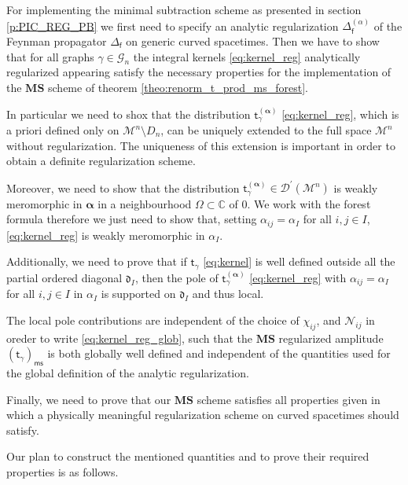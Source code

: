 \documentclass[11pt]{book}
\newcommand{\ms}{\mathsf{ms}}
\newcommand{\MS}{\textbf{MS}}
\newcommand{\alphabd}{\boldsymbol{\alpha}}
\newcommand{\Dcal}{\mathcal{D}}
\newcommand{\Gcal}{\mathcal{G}}
\newcommand{\Mcal}{\mathcal{M}}
\newcommand{\Ncal}{\mathcal{N}}
\newcommand{\Cbb}{\mathbb{C}}
\newcommand{\drak}{\mathfrak{d}}
\newcommand{\fsf}{\mathsf{f}}
\newcommand{\tsf}{\mathsf{t}}
\theoremstyle{break}
\begin{document}
For implementing the minimal subtraction scheme as presented in section \ref{p:PIC_REG_PB} we first need to specify an analytic regularization $\Delta^{(\alpha)}_\fsf$ of the Feynman propagator $\Delta_\fsf$ on generic curved spacetimes. Then we have to show that for all graphs $\gamma \in \Gcal_n$ the integral kernels \eqref{eq:kernel_reg} analytically regularized appearing satisfy the necessary properties for the implementation of the $\MS$ scheme of theorem \ref{theo:renorm_t_prod_ms_forest}. 


In particular we need to shox that the distribution $\tsf^{(\alphabd)}_\gamma$ \eqref{eq:kernel_reg}, which is a priori defined only on $\Mcal^n \setminus D_n$, can be uniquely extended to the full space $\Mcal^n$ without regularization. The uniqueness of this extension is important in order to obtain a definite regularization scheme. 


Moreover, we need to show that the distribution $\tsf^{(\alphabd)}_\gamma \in \Dcal^\prime(\Mcal^n)$ is weakly meromorphic in $\alphabd$ in a neighbourhood $\Omega \subset \Cbb$ of 0. We work with the forest formula therefore we just need to show that, setting $\alpha_{ij} = \alpha_I$ for all $i,j\in I$, \eqref{eq:kernel_reg} is weakly meromorphic in $\alpha_I$. 


Additionally, we need to prove that if $\tsf_\gamma$ \eqref{eq:kernel} is well defined outside all the partial ordered diagonal $\drak_I$, then the pole of $\tsf^{(\alphabd)}_\gamma$ \eqref{eq:kernel_reg} with $\alpha_{ij} = \alpha_I$ for all $i,j\in I$ in $\alpha_I$ is supported on $\drak_I$ and thus local. 


The local pole contributions are independent of the choice of $\chi_{ij}$, and $\Ncal_{ij}$ in oreder to write \ref{eq:kernel_reg_glob}, such that the $\MS$ regularized amplitude $(\tsf_\gamma)_\ms$ is both globally well defined and independent of the quantities used for the global definition of the analytic regularization. 


Finally, we need to prove that our $\MS$ scheme satisfies all properties given in \cite{hollands_local_2001,hollands_existence_2002} which a physically meaningful regularization scheme on curved spacetimes should satisfy.


Our plan to construct the mentioned quantities and to prove their required properties is as follows.
\end{document}
